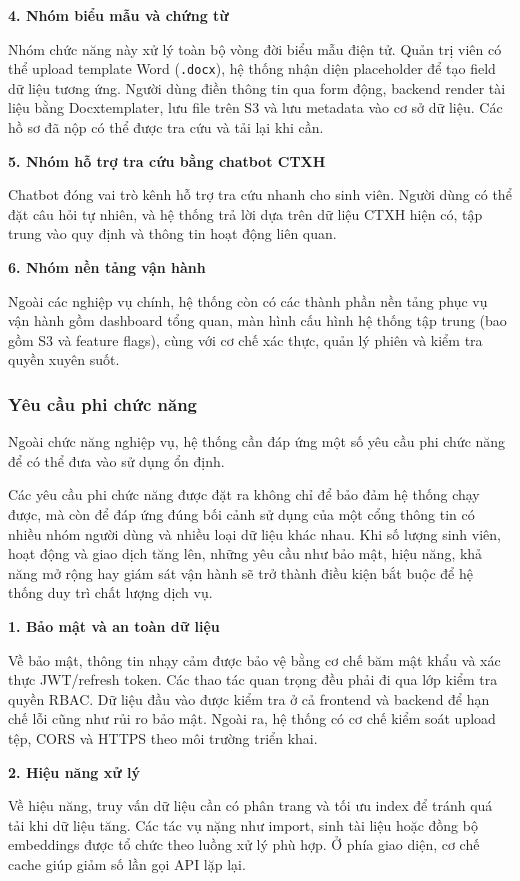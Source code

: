 \textbf{4. Nhóm biểu mẫu và chứng từ}\par
Nhóm chức năng này xử lý toàn bộ vòng đời biểu mẫu điện tử. Quản trị viên có thể upload template Word (\texttt{.docx}), hệ thống nhận diện placeholder để tạo field dữ liệu tương ứng. Người dùng điền thông tin qua form động, backend render tài liệu bằng Docxtemplater, lưu file trên S3 và lưu metadata vào cơ sở dữ liệu. Các hồ sơ đã nộp có thể được tra cứu và tải lại khi cần.

\textbf{5. Nhóm hỗ trợ tra cứu bằng chatbot CTXH}\par
Chatbot đóng vai trò kênh hỗ trợ tra cứu nhanh cho sinh viên. Người dùng có thể đặt câu hỏi tự nhiên, và hệ thống trả lời dựa trên dữ liệu CTXH hiện có, tập trung vào quy định và thông tin hoạt động liên quan.

\textbf{6. Nhóm nền tảng vận hành}\par
Ngoài các nghiệp vụ chính, hệ thống còn có các thành phần nền tảng phục vụ vận hành gồm dashboard tổng quan, màn hình cấu hình hệ thống tập trung (bao gồm S3 và feature flags), cùng với cơ chế xác thực, quản lý phiên và kiểm tra quyền xuyên suốt.

\subsubsection{Yêu cầu phi chức năng}
Ngoài chức năng nghiệp vụ, hệ thống cần đáp ứng một số yêu cầu phi chức năng để có thể đưa vào sử dụng ổn định.

Các yêu cầu phi chức năng được đặt ra không chỉ để bảo đảm hệ thống chạy được, mà còn để đáp ứng đúng bối cảnh sử dụng của một cổng thông tin có nhiều nhóm người dùng và nhiều loại dữ liệu khác nhau. Khi số lượng sinh viên, hoạt động và giao dịch tăng lên, những yêu cầu như bảo mật, hiệu năng, khả năng mở rộng hay giám sát vận hành sẽ trở thành điều kiện bắt buộc để hệ thống duy trì chất lượng dịch vụ.

\textbf{1. Bảo mật và an toàn dữ liệu}\par
Về bảo mật, thông tin nhạy cảm được bảo vệ bằng cơ chế băm mật khẩu và xác thực JWT/refresh token. Các thao tác quan trọng đều phải đi qua lớp kiểm tra quyền RBAC. Dữ liệu đầu vào được kiểm tra ở cả frontend và backend để hạn chế lỗi cũng như rủi ro bảo mật. Ngoài ra, hệ thống có cơ chế kiểm soát upload tệp, CORS và HTTPS theo môi trường triển khai.

\textbf{2. Hiệu năng xử lý}\par
Về hiệu năng, truy vấn dữ liệu cần có phân trang và tối ưu index để tránh quá tải khi dữ liệu tăng. Các tác vụ nặng như import, sinh tài liệu hoặc đồng bộ embeddings được tổ chức theo luồng xử lý phù hợp. Ở phía giao diện, cơ chế cache giúp giảm số lần gọi API lặp lại.

